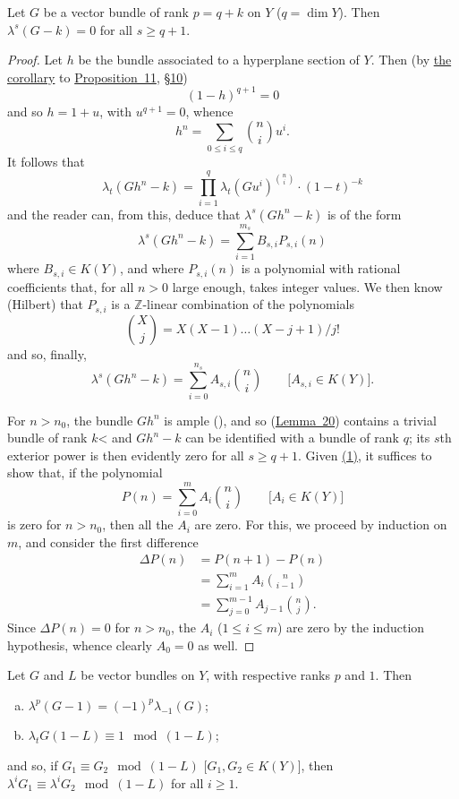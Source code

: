 \documentclass{article}
\theoremstyle{plain}
\newenvironment{lemma}[1]
    {\renewcommand\theinnerlemma{#1}\innerlemma}
    {\endinnerlemma}
\theoremstyle{definition}
\renewcommand{\geq}{\geqslant}
\renewcommand{\leq}{\leqslant}
\newcommand{\oldpage}[1]{\marginpar{\footnotesize$\Big\vert$ \textit{p.~#1}}}
\begin{document}
\begin{lemma}{21}
\label{lemma21}
  Let $G$ be a vector bundle of rank $p=q+k$ on $Y$ ($q=\dim Y$).
  Then $\lambda^s(G- k)=0$ for all $s\geq q+1$.
\end{lemma}

\begin{proof}
  Let $h$ be the bundle associated to a hyperplane section of $Y$.
  Then (by \hyperref[corollary-11]{the corollary} to \hyperref[proposition11]{Proposition~11}, \hyperref[section10]{\S10})
  \[
    (1-h)^{q+1} = 0
  \]
  and so $h=1+u$, with $u^{q+1}=0$, whence
  \[
    h^n = \sum_{0\leq i\leq q}\binom{n}{i}u^i.
  \]
  It follows that
  \[
    \lambda_t(Gh^n- k) = \prod_{i=1}^q \lambda_t(Gu^i)^{\binom{n}{i}}\cdot(1-t)^{-k}
  \]
  and the reader can, from this, deduce that $\lambda^s(Gh^n- k)$ is of the form
  \[
    \lambda^s(Gh^n- k) = \sum_{i=1}^{m_s} B_{s,i}P_{s,i}(n)
  \]
  where $B_{s,i}\in K(Y)$, and where $P_{s,i}(n)$ is a polynomial with rational coefficients that, for all $n>0$ large enough, takes integer values.
  We then know (Hilbert) that $P_{s,i}$ is a $\mathbb{Z}$-linear combination of the polynomials
  \[
    \binom{X}{j} = X(X-1)\ldots(X-j+1)/j!
  \]
  and so, finally,
  \[
  \label{lemma21equation1}
    \lambda^s(Gh^n- k) = \sum_{i=0}^{n_s} A_{s,i}\binom{n}{i}
    \qquad\mbox{[$A_{s,i}\in K(Y)$].}
    \tag{1}
  \]

  For $n>n_0$, the bundle $Gh^n$ is ample (\cite{12}), and so (\hyperref[lemma20]{Lemma~20}) contains a trivial bundle of rank $k$< and $Gh^n- k$ can be identified with a bundle of rank $q$;
  its $s$th exterior power is then evidently zero for all $s\geq q+1$.
  Given \hyperref[lemma21equation1]{(1)}, it
\oldpage{134}
  suffices to show that, if the polynomial
  \[
    P(n) = \sum_{i=0}^m A_i\binom{n}{i}
    \qquad\mbox{[$A_i\in K(Y)$]}
  \]
  is zero for $n>n_0$, then all the $A_i$ are zero.
  For this, we proceed by induction on $m$, and consider the first difference
  \begin{align*}
    \Delta P(n)
    &= P(n+1) - P(n)
  \\&= \sum_{i=1}^m A_i\binom{n}{i-1}
  \\&= \sum_{j=0}^{m-1} A_{j-1}\binom{n}{j}.
  \end{align*}
  Since $\Delta P(n)=0$ for $n>n_0$, the $A_i$ ($1\leq i\leq m$) are zero by the induction hypothesis, whence clearly $A_0=0$ as well.
\end{proof}

\begin{lemma}{22}
\label{lemma22}
  Let $G$ and $L$ be vector bundles on $Y$, with respective ranks $p$ and $1$.
  Then
  \begin{enumerate}[(a)]
    \item $\lambda^p(G-1) = (-1)^p\lambda_{-1}(G)$;
    \item $\lambda_t G(1- L) \equiv 1\mod(1-L)$;
  \end{enumerate}
  and so, if $G_1\equiv G_2\mod(1-L)$ [$G_1,G_2\in K(Y)$], then $\lambda^iG_1\equiv\lambda^iG_2\mod(1-L)$ for all $i\geq1$.
\end{lemma}
\end{document}
